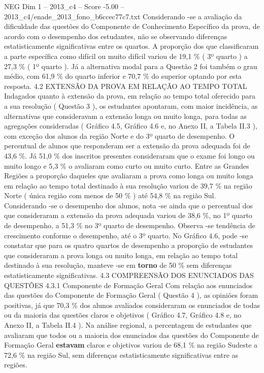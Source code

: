 \begin{textsample}{NEG Dim 1 – 2013\_c4 – Score -5.00 – 2013\_c4/enade\_2013\_fono\_b6ccec77c7.txt}
Considerando -se a avaliação da dificuldade das questões do Componente de Conhecimento Específico da prova, de acordo com o desempenho dos estudantes, não se observando diferenças estatisticamente significativas entre os quartos.
A proporção dos que classificaram a parte específica como difícil ou muito difícil variou de 19,1 \% ( 3º quarto ) a 27,3 \% ( 1º quarto ).
Já a alternativa modal para a Questão 2 foi também o grau médio, com 61,9 \% do quarto inferior e 70,7 \% do superior optando por esta resposta. 4.2 EXTENSÃO DA PROVA EM RELAÇÃO AO TEMPO TOTAL Indagados quanto à extensão da prova, em relação ao tempo total oferecido para a sua resolução ( Questão 3 ), os estudantes apontaram, com maior incidência, as alternativas que consideravam a extensão longa ou muito longa, para todas as agregações consideradas ( Gráfico 4.5, Gráfico 4.6 e, no Anexo II, a Tabela II.3 ), com exceção dos alunos da região Norte e do 3º quarto de desempenho.
O percentual de alunos que responderam ser a extensão da prova adequada foi de 43,6 \%.
Já 51,0 \% dos inscritos presentes consideraram que o exame foi longo ou muito longo e 5,3 \% o avaliaram como curto ou muito curto.
Entre as Grandes Regiões a proporção daqueles que avaliaram a prova como longa ou muito longa em relação ao tempo total destinado à sua resolução variou de 39,7 \% na região Norte ( única região com menos de 50 \% ) até 54,8 \% na região Sul.
Considerando -se o desempenho dos alunos, nota -se ainda que o percentual dos que consideraram a extensão da prova adequada variou de 38,6 \%, no 1º quarto de desempenho, a 51,3 \% no 3º quarto de desempenho.
Observa -se tendência de crescimento conforme o desempenho, até o 3º quarto.
No Gráfico 4.6, pode -se constatar que para os quatro quartos de desempenho a proporção de estudantes que consideraram a prova longa ou muito longa, em relação ao tempo total destinado à sua resolução, manteve -se em \textbf{torno} de 50 \% sem diferenças estatisticamente significativas. 4.3 COMPREENSÃO DOS ENUNCIADOS DAS QUESTÕES 4.3.1 Componente de Formação Geral Com relação aos enunciados das questões do Componente de Formação Geral ( Questão 4 ), as opiniões foram positivas, já que 70,3 \% dos alunos avaliados consideraram os enunciados de todas ou da maioria das questões claros e objetivos ( Gráfico 4.7, Gráfico 4.8 e, no Anexo II, a Tabela II.4 ).
Na análise regional, a percentagem de estudantes que avaliaram que todos ou a maioria dos enunciados das questões do Componente de Formação Geral \textbf{estavam} claros e objetivos variou de 68,1 \% na região Sudeste a 72,6 \% na região Sul, sem diferenças estatisticamente significativas entre as regiões.

\end{textsample}
